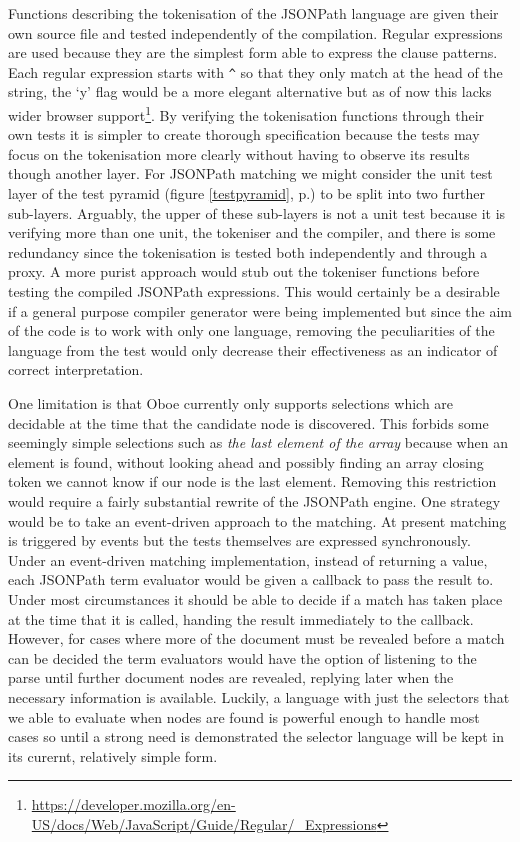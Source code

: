 \documentclass[12pt, ]{article}
\begin{document}
Functions describing the tokenisation of the JSONPath language are given
their own source file and tested independently of the compilation.
Regular expressions are used because they are the simplest form able to
express the clause patterns. Each regular expression starts with
\texttt{\^{}} so that they only match at the head of the string, the `y'
flag would be a more elegant alternative but as of now this lacks wider
browser support\footnote{\url{https://developer.mozilla.org/en-US/docs/Web/JavaScript/Guide/Regular/_Expressions}}.
By verifying the tokenisation functions through their own tests it is
simpler to create thorough specification because the tests may focus on
the tokenisation more clearly without having to observe its results
though another layer. For JSONPath matching we might consider the unit
test layer of the test pyramid (figure \ref{testpyramid},
p.\pageref{testpyramid}) to be split into two further sub-layers.
Arguably, the upper of these sub-layers is not a unit test because it is
verifying more than one unit, the tokeniser and the compiler, and there
is some redundancy since the tokenisation is tested both independently
and through a proxy. A more purist approach would stub out the tokeniser
functions before testing the compiled JSONPath expressions. This would
certainly be a desirable if a general purpose compiler generator were
being implemented but since the aim of the code is to work with only one
language, removing the peculiarities of the language from the test would
only decrease their effectiveness as an indicator of correct
interpretation.

One limitation is that Oboe currently only supports selections which are
decidable at the time that the candidate node is discovered. This
forbids some seemingly simple selections such as \emph{the last element
of the array} because when an element is found, without looking ahead
and possibly finding an array closing token we cannot know if our node
is the last element. Removing this restriction would require a fairly
substantial rewrite of the JSONPath engine. One strategy would be to
take an event-driven approach to the matching. At present matching is
triggered by events but the tests themselves are expressed
synchronously. Under an event-driven matching implementation, instead of
returning a value, each JSONPath term evaluator would be given a
callback to pass the result to. Under most circumstances it should be
able to decide if a match has taken place at the time that it is called,
handing the result immediately to the callback. However, for cases where
more of the document must be revealed before a match can be decided the
term evaluators would have the option of listening to the parse until
further document nodes are revealed, replying later when the necessary
information is available. Luckily, a language with just the selectors
that we able to evaluate when nodes are found is powerful enough to
handle most cases so until a strong need is demonstrated the selector
language will be kept in its curernt, relatively simple form.
\end{document}
